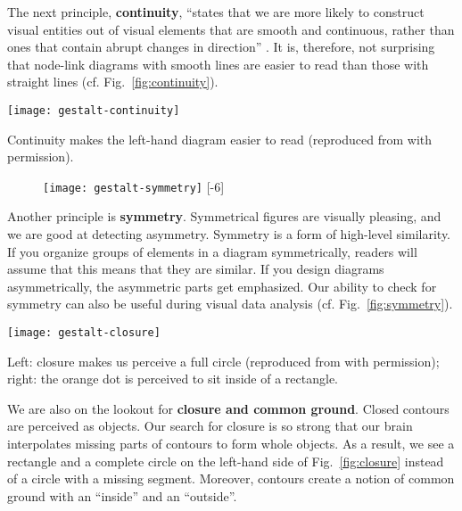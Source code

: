 The next principle, \textbf{continuity}, ``states that we are more likely to construct visual entities out of visual elements that are smooth and continuous, rather than ones that contain abrupt changes in direction'' \cite{Ware12}. It is, therefore, not surprising that node-link diagrams with smooth lines are easier to read than those with straight lines (cf. Fig.~\ref{fig:continuity}).

\begin{marginfigure}[-1\baselineskip]
\centering
\texttt{[image: gestalt-continuity]}
\caption{\label{fig:continuity} Continuity makes the left-hand diagram easier to read (reproduced from \cite{Ware12} with permission).}
\end{marginfigure}

\begin{figure}
\centering
\texttt{[image: gestalt-symmetry]}
[-6\baselineskip]
\end{figure}

Another principle is \textbf{symmetry}. Symmetrical figures are visually pleasing, and we are good at detecting asymmetry. Symmetry is a form of high-level similarity. If you organize groups of elements in a diagram symmetrically, readers will assume that this means that they are similar. If you design diagrams asymmetrically, the asymmetric parts get emphasized. Our ability to check for symmetry can also be useful during visual data analysis (cf. Fig.~\ref{fig:symmetry}).

\begin{marginfigure}
\centering
\texttt{[image: gestalt-closure]}
\caption{\label{fig:closure} Left: closure makes us perceive a full circle (reproduced from \cite{Ware12} with permission); right: the orange dot is perceived to sit inside of a rectangle.}
\end{marginfigure}

We are also on the lookout for \textbf{closure and common ground}. Closed contours are perceived as objects. Our search for closure is so strong that our brain interpolates missing parts of contours to form whole objects. As a result, we see a rectangle and a complete circle on the left-hand side of Fig.~\ref{fig:closure} instead of a circle with a missing segment. Moreover, contours create a notion of common ground with an ``inside'' and an ``outside''.

